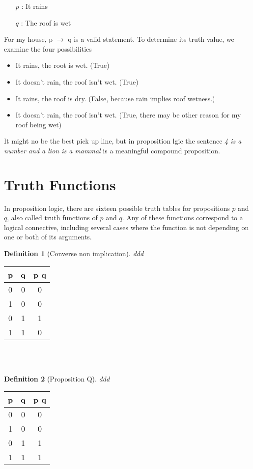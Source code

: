 \documentclass[10pt,a4paper,draft,titlepage,onecolumn]{book}
\newtheorem{definition}{Definition}[section]
\begin{document}
\begin{itemize}
\item[$p$]: It rains
\item[$q$]: The roof is wet
\end{itemize}

For my house, p $\rightarrow$ q is a valid statement.
To determine its truth value, we examine the four possibilities

\begin{itemize}
\item It rains, the root is wet. (True)
\item It doesn't rain, the roof isn't wet. (True)
\item It rains, the roof is dry. (False, because rain implies roof wetness.)
\item It doesn't rain, the roof isn't wet. (True, there may be other reason for my roof being wet)
\end{itemize}

It might no be the best pick up line, but in proposition lgic the sentence \textit{4 is a number and a lion is a mammal} is a meaningful compound proposition.

\section{Truth Functions}
In proposition logic, there are sixteen possible truth tables for propositions $p$ and $q$, also called truth functions of $p$ and $q$. Any of these functions correspond to a logical connective, including several cases where the function is  not depending on one or both of its arguments.




\begin{definition}[Converse non implication]ddd
\end{definition}  
\begin{tabular}{ |c|c|c| }
 \hline
 p & q &  p  q  \\
 \hline
 0 & 0 & 0 \\
 1 & 0 & 0\\
 0 & 1 & 1\\
 1 & 1 & 0\\
 \hline
\end{tabular}\\\\

\begin{definition}[Proposition Q]ddd
\end{definition}
\begin{tabular}{ |c|c|c| }
 \hline
 p & q &  p  q  \\
 \hline
 0 & 0 & 0 \\
 1 & 0 & 0\\
 0 & 1 & 1\\
 1 & 1 & 1\\
 \hline
\end{tabular}\\\\
\end{document}
